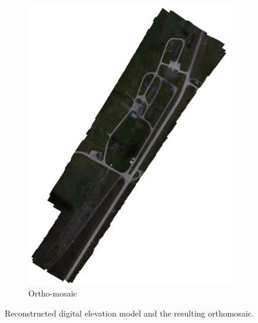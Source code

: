 \documentclass{article}
\begin{document}
\begin{figure} [h]
\begin{subfigure} [b]{0.33\textwidth}
         \includegraphics[scale=0.035]{ROB-15-0035_fig24c}
         \caption{Ortho-mosaic}
         \label{fig:cccc}
    \end{subfigure}%
    \caption{Reconstructed digital elevation model and the resulting orthomosaic.}
    \label{fig:hmap}
\end{figure}
\end{document}
